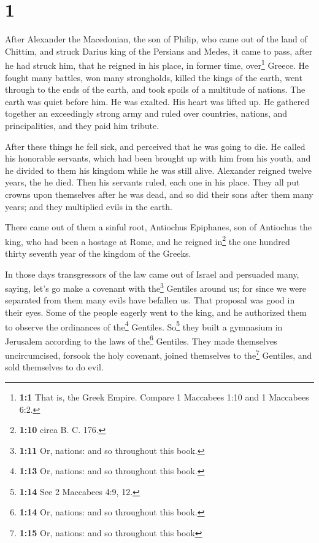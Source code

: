 \hypertarget{section}{%
\section{1}\label{section}}

 After Alexander the Macedonian, the son of Philip, who
came out of the land of Chittim, and struck Darius king of the Persians
and Medes, it came to pass, after he had struck him, that he reigned in
his place, in former time, over\footnote{\textbf{1:1} That is, the Greek
  Empire. Compare 1 Maccabees 1:10 and 1 Maccabees 6:2.} Greece.
 He fought many battles, won many strongholds, killed the
kings of the earth,  went through to the ends of the
earth, and took spoils of a multitude of nations. The earth was quiet
before him. He was exalted. His heart was lifted up.  He
gathered together an exceedingly strong army and ruled over countries,
nations, and principalities, and they paid him tribute.

 After these things he fell sick, and perceived that he
was going to die.  He called his honorable servants, which
had been brought up with him from his youth, and he divided to them his
kingdom while he was still alive.  Alexander reigned
twelve years, the he died.  Then his servants ruled, each
one in his place.  They all put crowns upon themselves
after he was dead, and so did their sons after them many years; and they
multiplied evils in the earth.

 There came out of them a sinful root, Antiochus
Epiphanes, son of Antiochus the king, who had been a hostage at Rome,
and he reigned in\footnote{\textbf{1:10} circa B. C. 176.} the one
hundred thirty seventh year of the kingdom of the Greeks.

 In those days transgressors of the law came out of
Israel and persuaded many, saying, let's go make a covenant with
the\footnote{\textbf{1:11} Or, nations: and so throughout this book.}
Gentiles around us; for since we were separated from them many evils
have befallen us.  That proposal was good in their eyes.
 Some of the people eagerly went to the king, and he
authorized them to observe the ordinances of the\footnote{\textbf{1:13}
  Or, nations: and so throughout this book.} Gentiles. 
So\footnote{\textbf{1:14} See 2 Maccabees 4:9, 12.} they built a
gymnasium in Jerusalem according to the laws of the\footnote{\textbf{1:14}
  Or, nations: and so throughout this book.} Gentiles. 
They made themselves uncircumcised, forsook the holy covenant, joined
themselves to the\footnote{\textbf{1:15} Or, nations: and so throughout
  this book} Gentiles, and sold themselves to do evil.

